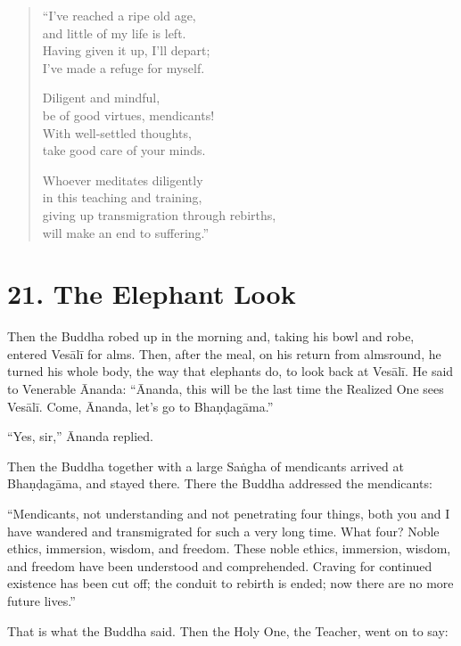 \documentclass[12pt,openany]{book}%
\begin{document}
\begin{verse}%
“I’ve reached a ripe old age, \\
and little of my life is left. \\
Having given it up, I’ll depart; \\
I’ve made a refuge for myself. 

Diligent and mindful, \\
be of good virtues, mendicants! \\
With well-settled thoughts, \\
take good care of your minds. 

Whoever meditates diligently \\
in this teaching and training, \\
giving up transmigration through rebirths, \\
will make an end to suffering.” 

%
\end{verse}

\section*{21. The Elephant Look }

Then the Buddha robed up in the morning and, taking his bowl and robe, entered \textsanskrit{Vesālī} for alms. Then, after the meal, on his return from almsround, he turned his whole body, the way that elephants do, to look back at \textsanskrit{Vesālī}. He said to Venerable Ānanda: “Ānanda, this will be the last time the Realized One sees \textsanskrit{Vesālī}. Come, Ānanda, let’s go to \textsanskrit{Bhaṇḍagāma}.” 

“Yes, sir,” Ānanda replied. 

Then the Buddha together with a large \textsanskrit{Saṅgha} of mendicants arrived at \textsanskrit{Bhaṇḍagāma}, and stayed there. There the Buddha addressed the mendicants: 

“Mendicants, not understanding and not penetrating four things, both you and I have wandered and transmigrated for such a very long time. What four? Noble ethics, immersion, wisdom, and freedom. These noble ethics, immersion, wisdom, and freedom have been understood and comprehended. Craving for continued existence has been cut off; the conduit to rebirth is ended; now there are no more future lives.” 

That is what the Buddha said. Then the Holy One, the Teacher, went on to say: 
\end{document}
